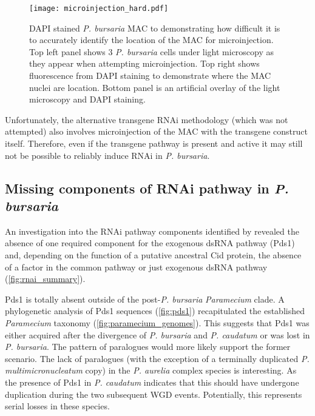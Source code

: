 \begin{figure}
    \centering
    \texttt{[image: microinjection\_hard.pdf]}
    \caption[DAPI stained \textit{P. bursaria} MAC]{
        DAPI stained \textit{P. bursaria}
        MAC to demonstrating how difficult it is to accurately identify the location
        of the MAC for microinjection.  Top left panel shows 3 \textit{P. bursaria}
    cells under light microscopy as they appear when attempting
microinjection. Top right shows fluorescence from DAPI staining to demonstrate
where the MAC nuclei are location.  Bottom panel is an artificial overlay
of the light microscopy and DAPI staining.}
    \label{fig:microinjection_nucleus}
\end{figure}

Unfortunately, the alternative transgene RNAi methodology \citep{Galvani2001} 
(which was not attempted) also involves microinjection of the MAC with
the transgene construct itself.  Therefore, even if the transgene
pathway is present and active it may still not be possible to reliably
induce RNAi in \textit{P. bursaria}.

\subsection{Missing components of RNAi pathway in \textit{P. bursaria}}

An investigation into the RNAi pathway components identified by \citep{Marker2014}
revealed the absence of one required component for the exogenous dsRNA
pathway (Pds1) and, depending on the function of a putative ancestral
Cid protein, the absence of a factor in the common pathway or just
exogenous dsRNA pathway (\cref{fig:rnai_summary}).


Pds1 is totally absent outside of the post-\textit{P. bursaria} 
\textit{Paramecium} clade.
A phylogenetic analysis of Pds1 sequences (\cref{fig:pds1}) 
recapitulated the established 
\textit{Paramecium} taxonomy (\cref{fig:paramecium_genomes}).
This suggests that Pds1 was either acquired after the divergence of \textit{P. bursaria}
and \textit{P. caudatum} or was lost in \textit{P. bursaria}.
The pattern of paralogues would more likely support the former scenario.
The lack of paralogues (with the exception of a terminally duplicated \textit{P. multimicronucleatum}
copy) in the \textit{P. aurelia} complex species is interesting.  As the presence
of Pds1 in \textit{P. caudatum} indicates that this should have undergone
duplication during the two subsequent WGD events.  Potentially, this represents
serial losses in these species.

